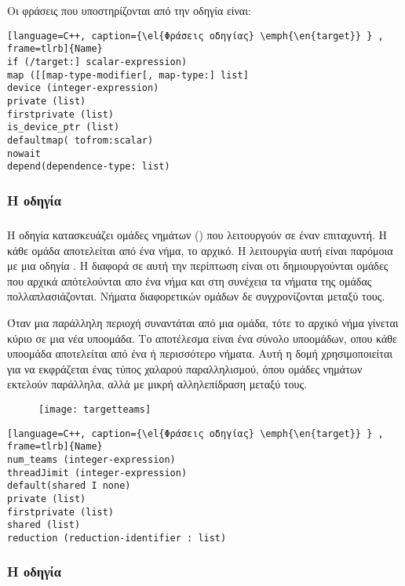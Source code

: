 Οι φράσεις που υποστηρίζονται από την οδηγία είναι:

\begin{lstlisting}[language=C++, caption={\el{Φράσεις οδηγίας} \emph{\en{target}} } , frame=tlrb]{Name}
if (/target:] scalar-expression)
map ([[map-type-modifier[, map-type:] list]
device (integer-expression)
private (list)
firstprivate (list)
is_device_ptr (list)
defaultmap( tofrom:scalar)
nowait
depend(dependence-type: list)
\end{lstlisting}

\subsubsection{Η οδηγία }
\subparagraph{}
Η οδηγία \emph{} κατασκευάζει ομάδες νημάτων (\emph{}) που λειτουργούν σε έναν επιταχυντή. Η κάθε ομάδα αποτελείται από ένα νήμα, το αρχικό. Η λειτουργία αυτή είναι παρόμοια με μια οδηγία \emph{}. H διαφορά σε αυτή την περίπτωση είναι οτι δημιουργούνται ομάδες που αρχικά απότελούνται απο ένα νήμα και στη συνέχεια τα νήματα της ομάδας πολλαπλασιάζονται. Νήματα διαφορετικών ομάδων δε συγχρονίζονται μεταξύ τους.

Όταν μια παράλληλη περιοχή συναντάται από μια ομάδα, τότε το αρχικό νήμα γίνεται κύριο σε μια νέα υποομάδα. Το αποτέλεσμα είναι ένα σύνολο υποομάδων, οπου κάθε υποομάδα αποτελείται από ένα ή περισσότερο νήματα. Αυτή η δομή χρησιμοποιείται για να εκφράζεται ένας τύπος χαλαρού παραλληλισμού, όπου ομάδες νημάτων εκτελούν παράλληλα, αλλά με μικρή αλληλεπίδραση μεταξύ τους.

\begin{figure}[h]
\texttt{[image: targetteams]}
\centering
\captionsetup{justification=centering, singlelinecheck=false}
	\caption{\emph{}\cite{targettteams}}
\label{fig:targetteams}
\end{figure}


\begin{lstlisting}[language=C++, caption={\el{Φράσεις οδηγίας} \emph{\en{target}} } , frame=tlrb]{Name}
num_teams (integer-expression)
threadJimit (integer-expression)
default(shared I none)
private (list)
firstprivate (list)
shared (list)
reduction (reduction-identifier : list)
\end{lstlisting}
\clearpage
\subsubsection{Η οδηγία }
\subparagraph{}



